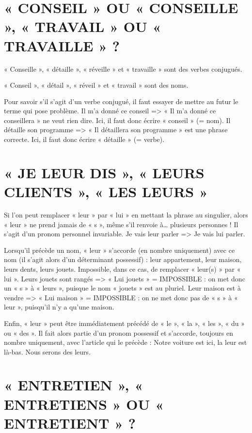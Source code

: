 \section{« CONSEIL » OU « CONSEILLE », « TRAVAIL » OU « TRAVAILLE » ?}

« Conseille », « détaille », « réveille » et « travaille » sont des verbes conjugués.

« Conseil », « détail », « réveil » et « travail » sont des noms.

Pour savoir s'il s'agit d'un verbe conjugué, il faut essayer de mettre au futur le terme qui pose problème.
Il m'a donné ce conseil => « Il m'a donné ce conseillera » ne veut rien dire. Ici, il faut donc écrire « conseil » (= nom).
Il détaille son programme => « Il détaillera son programme » est une phrase correcte. Ici, il faut donc écrire « détaille » (= verbe).

\section{« JE LEUR DIS », « LEURS CLIENTS », « LES LEURS »}

Si l'on peut remplacer « leur » par « lui » en mettant la phrase au singulier, alors « leur » ne prend jamais de « s », même s'il renvoie à… plusieurs personnes ! Il s'agit d'un pronom personnel invariable.
Je vais leur parler => Je vais lui parler.

Lorsqu'il précède un nom, « leur » s'accorde (en nombre uniquement) avec ce nom (il s'agit alors d'un déterminant possessif) : leur appartement, leur maison, leurs dents, leurs jouets.
Impossible, dans ce cas, de remplacer « leur(s) » par « lui ».
Leurs jouets sont rangés => « Lui jouets » = IMPOSSIBLE : on met donc un « s » à « leurs », puisque le nom « jouets » est au pluriel.
Leur maison est à vendre => « Lui maison » = IMPOSSIBLE : on ne met donc pas de « s » à « leur », puisqu'il n'y a qu'une maison.

Enfin, « leur » peut être immédiatement précédé de « le », « la », « les », « du » ou « des ». Il fait alors partie d'un pronom possessif et s'accorde, toujours en nombre uniquement, avec l'article qui le précède : Notre voiture est ici, la leur est là‑bas. Nous serons des leurs.

\section{« ENTRETIEN », « ENTRETIENS » OU « ENTRETIENT » ?}

